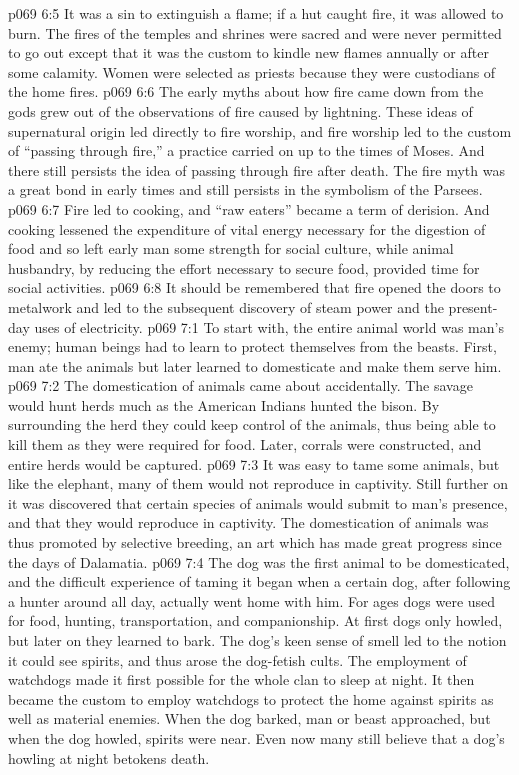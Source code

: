 \vs p069 6:5 It was a sin to extinguish a flame; if a hut caught fire, it was allowed to burn. The fires of the temples and shrines were sacred and were never permitted to go out except that it was the custom to kindle new flames annually or after some calamity. Women were selected as priests because they were custodians of the home fires.\plusone
\vs p069 6:6 The early myths about how fire came down from the gods grew out of the observations of fire caused by lightning. These ideas of supernatural origin led directly to fire worship, and fire worship led to the custom of “passing through fire,” a practice carried on up to the times of Moses. And there still persists the idea of passing through fire after death. The fire myth was a great bond in early times and still persists in the symbolism of the Parsees.
\pc \vs p069 6:7 Fire led to cooking, and “raw eaters” became a term of derision. And cooking lessened the expenditure of vital energy necessary for the digestion of food and so left early man some strength for social culture, while animal husbandry, by reducing the effort necessary to secure food, provided time for social activities.
\vs p069 6:8 It should be remembered that fire opened the doors to metalwork and led to the subsequent discovery of steam power and the present\hyp{}day uses of electricity.
\vs p069 7:1 To start with, the entire animal world was man’s enemy; human beings had to learn to protect themselves from the beasts. First, man ate the animals but later learned to domesticate and make them serve him.
\vs p069 7:2 The domestication of animals came about accidentally. The savage would hunt herds much as the American Indians hunted the bison. By surrounding the herd they could keep control of the animals, thus being able to kill them as they were required for food. Later, corrals were constructed, and entire herds would be captured.
\vs p069 7:3 It was easy to tame some animals, but like the elephant, many of them would not reproduce in captivity. Still further on it was discovered that certain species of animals would submit to man’s presence, and that they would reproduce in captivity. The domestication of animals was thus promoted by selective breeding, an art which has made great progress since the days of Dalamatia.
\vs p069 7:4 The dog was the first animal to be domesticated, and the difficult experience of taming it began when a certain dog, after following a hunter around all day, actually went home with him. For ages dogs were used for food, hunting, transportation, and companionship. At first dogs only howled, but later on they learned to bark. The dog’s keen sense of smell led to the notion it could see spirits, and thus arose the dog\hyp{}fetish cults. The employment of watchdogs made it first possible for the whole clan to sleep at night. It then became the custom to employ watchdogs to protect the home against spirits as well as material enemies. When the dog barked, man or beast approached, but when the dog howled, spirits were near. Even now many still believe that a dog’s howling at night betokens death.

